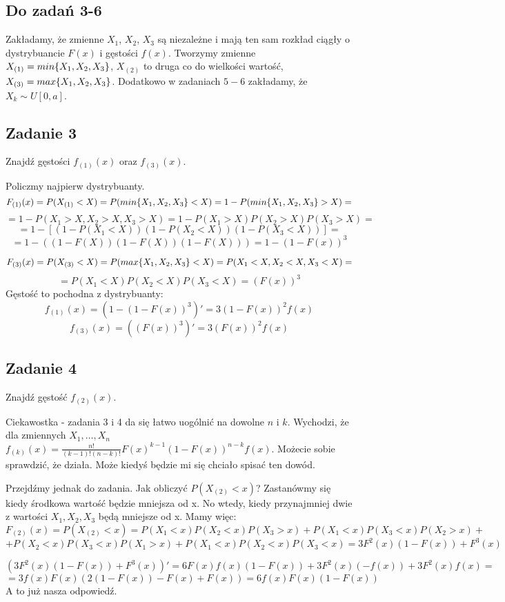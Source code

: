 \documentclass[a4paper]{article}
\DeclarePairedDelimiter\set{\lbrace}{\rbrace}
\begin{document}
\subsection*{Do zadań 3-6}
Zakładamy, że zmienne $X_1$, $X_2$, $X_3$ są niezależne i mają ten sam rozkład ciągły o dystrybuancie $F(x)$ i gęstości $f(x)$. Tworzymy zmienne $X_{(1)}=min\set{X_1,X_2,X_3}$, $X_{(2)}$ to druga co do wielkości wartość, $X_{(3)}=max\set{X_1,X_2,X_3}$. Dodatkowo w zadaniach $5-6$ zakładamy, że $X_k \sim U[0,a]$.
\clearpage
\subsection*{Zadanie 3}
Znajdź gęstości $f_{(1)}(x)$ oraz $f_{(3)}(x)$.

Policzmy najpierw dystrybuanty.
$$F_{(1)}(x)=P(X_{(1)}<X)=P(min\set{X_1,X_2,X_3}<X)=1-P(min\set{X_1,X_2,X_3} > X)=$$ $$=1-P(X_1>X, X_2>X, X_3>X)=1-P(X_1>X)P(X_2>X)P(X_3>X)=$$ $$=1-\left[ (1-P(X_1<X))(1-P(X_2<X))(1-P(X_3<X)) \right] =$$ $$= 1-\left( (1-F(X))(1-F(X))(1-F(X)) \right)=1-(1-F(x))^3 $$ 

$$F_{(3)}(x)=P(X_{(3)}<X)= P(max\set{X_1,X_2,X_3}<X)=P(X_1<X,X_2<X,X_3<X)=$$ $$=P(X_1<X)P(X_2<X)P(X_3<X)=(F(x))^3$$
Gęstość to pochodna z dystrybuanty:
$$f_{(1)}(x)= (1-(1-F(x))^3)' = 3(1-F(x))^2f(x) $$
$$f_{(3)}(x) = ((F(x))^3)' = 3(F(x))^2 f(x) $$
\subsection*{Zadanie 4}
Znajdź gęstość $f_{(2)}(x)$.

Ciekawostka - zadania 3 i 4 da się łatwo uogólnić na dowolne $n$ i $k$. Wychodzi, że dla zmiennych $X_1,\dots ,X_n$ $f_{(k)}(x)=\frac{n!}{(k-1)!(n-k)!}F(x)^{k-1}(1-F(x))^{n-k}f(x)$. Możecie sobie sprawdzić, że działa. Może kiedyś będzie mi się chciało spisać ten dowód.

Przejdźmy jednak do zadania. Jak obliczyć $P(X_{(2)}<x)$? Zastanówmy się kiedy środkowa wartość będzie mniejsza od x. No wtedy, kiedy przynajmniej dwie z wartości $X_1,X_2,X_3$ będą mniejsze od x. Mamy więc:
$$F_{(2)}(x)=P(X_{(2)}<x)=P(X_1<x)P(X_2<x)P(X_3>x)+P(X_1<x)P(X_3<x)P(X_2>x)+$$ $$+P(X_2<x)P(X_3<x)P(X_1>x)+P(X_1<x)P(X_2<x)P(X_3<x)=3F^2(x)(1-F(x))+F^3(x) $$

$$(3F^2(x)(1-F(x))+F^3(x))'=6F(x)f(x)(1-F(x)) + 3F^2(x)(-f(x)) + 3F^2(x) f(x)=$$
$$=3f(x)F(x)(2(1-F(x))-F(x)+F(x))=6f(x)F(x)(1-F(x))$$
A to już nasza odpowiedź.
\end{document}
